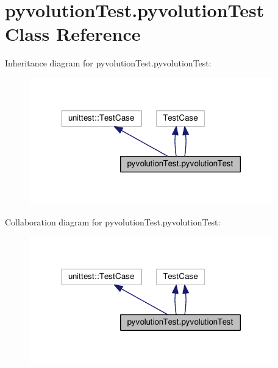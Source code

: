 \hypertarget{classpyvolutionTest_1_1pyvolutionTest}{}\section{pyvolution\+Test.\+pyvolution\+Test Class Reference}
\label{classpyvolutionTest_1_1pyvolutionTest}


Inheritance diagram for pyvolution\+Test.\+pyvolution\+Test\+:\nopagebreak
\begin{figure}[H]
\begin{center}
\leavevmode
\includegraphics[width=300pt]{classpyvolutionTest_1_1pyvolutionTest__inherit__graph}
\end{center}
\end{figure}


Collaboration diagram for pyvolution\+Test.\+pyvolution\+Test\+:\nopagebreak
\begin{figure}[H]
\begin{center}
\leavevmode
\includegraphics[width=300pt]{classpyvolutionTest_1_1pyvolutionTest__coll__graph}
\end{center}
\end{figure}
